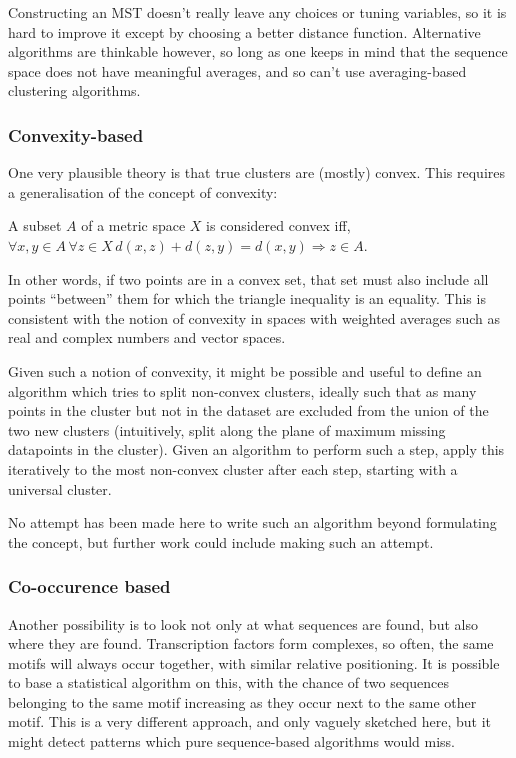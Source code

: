 \documentclass[fleqn]{book}
\begin{document}
Constructing an MST doesn't really leave any choices or tuning
variables, so it is hard to improve it except by choosing a better
distance function. Alternative algorithms are thinkable however, so long
as one keeps in mind that the sequence space does not have meaningful
averages, and so can't use averaging-based clustering algorithms.

\subsubsection{Convexity-based}\label{convexity-based}

One very plausible theory is that true clusters are (mostly) convex.
This requires a generalisation of the concept of convexity:

A subset \(A\) of a metric space \(X\) is considered convex iff,
\(∀ x, y ∈ A \, ∀ z ∈ X \, d(x,z) + d(z,y) = d(x,y) ⇒ z ∈ A\).

In other words, if two points are in a convex set, that set must also
include all points ``between'' them for which the triangle inequality is
an equality. This is consistent with the notion of convexity in spaces
with weighted averages such as real and complex numbers and vector
spaces.

Given such a notion of convexity, it might be possible and useful to
define an algorithm which tries to split non-convex clusters, ideally
such that as many points in the cluster but not in the dataset are
excluded from the union of the two new clusters (intuitively, split
along the plane of maximum missing datapoints in the cluster). Given an
algorithm to perform such a step, apply this iteratively to the most
non-convex cluster after each step, starting with a universal cluster.

No attempt has been made here to write such an algorithm beyond
formulating the concept, but further work could include making such an
attempt.

\subsubsection{Co-occurence based}\label{co-occurence-based}

Another possibility is to look not only at what sequences are found, but
also where they are found. Transcription factors form complexes, so
often, the same motifs will always occur together, with similar relative
positioning. It is possible to base a statistical algorithm on this,
with the chance of two sequences belonging to the same motif increasing
as they occur next to the same other motif. This is a very different
approach, and only vaguely sketched here, but it might detect patterns
which pure sequence-based algorithms would miss.
\end{document}
